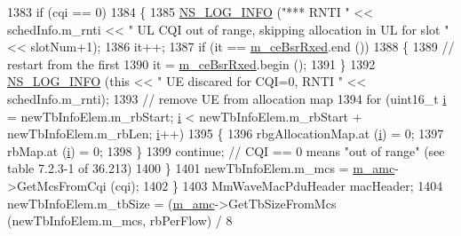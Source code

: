 \begin{DoxyCode}
1383                         \textcolor{keywordflow}{if} (cqi == 0)
1384                         \{
1385                                 \hyperlink{group__logging_gafbd73ee2cf9f26b319f49086d8e860fb}{NS\_LOG\_INFO} (\textcolor{stringliteral}{"*** RNTI "} << schedInfo.m\_rnti << \textcolor{stringliteral}{" UL CQI out of
       range, skipping allocation in UL for slot "} << slotNum+1);
1386                                 it++;
1387                                 \textcolor{keywordflow}{if} (it == \hyperlink{classns3_1_1MmWaveRrMacScheduler_a2ebec374f1ff5014f115ff8b68ff5ebb}{m\_ceBsrRxed}.end ())
1388                                 \{
1389                                         \textcolor{comment}{// restart from the first}
1390                                         it = \hyperlink{classns3_1_1MmWaveRrMacScheduler_a2ebec374f1ff5014f115ff8b68ff5ebb}{m\_ceBsrRxed}.begin ();
1391                                 \}
1392                                 \hyperlink{group__logging_gafbd73ee2cf9f26b319f49086d8e860fb}{NS\_LOG\_INFO} (\textcolor{keyword}{this} << \textcolor{stringliteral}{" UE discared for CQI=0, RNTI "} << 
      schedInfo.m\_rnti);
1393                                 \textcolor{comment}{// remove UE from allocation map}
1394                                 \textcolor{keywordflow}{for} (uint16\_t \hyperlink{bernuolliDistribution_8m_a6f6ccfcf58b31cb6412107d9d5281426}{i} = newTbInfoElem.m\_rbStart; \hyperlink{bernuolliDistribution_8m_a6f6ccfcf58b31cb6412107d9d5281426}{i} < newTbInfoElem.m\_rbStart + 
      newTbInfoElem.m\_rbLen; \hyperlink{bernuolliDistribution_8m_a6f6ccfcf58b31cb6412107d9d5281426}{i}++)
1395                                 \{
1396                                         rbgAllocationMap.at (\hyperlink{bernuolliDistribution_8m_a6f6ccfcf58b31cb6412107d9d5281426}{i}) = 0;
1397                                         rbMap.at (\hyperlink{bernuolliDistribution_8m_a6f6ccfcf58b31cb6412107d9d5281426}{i}) = 0;
1398                                 \}
1399                                 \textcolor{keywordflow}{continue}; \textcolor{comment}{// CQI == 0 means "out of range" (see table 7.2.3-1 of 36.213)}
1400                         \}
1401                         newTbInfoElem.m\_mcs = \hyperlink{classns3_1_1MmWaveRrMacScheduler_abbcdddd7d8733f372963069e1d0395d3}{m\_amc}->GetMcsFromCqi (cqi);
1402                 \}
1403                 MmWaveMacPduHeader macHeader;
1404                 newTbInfoElem.m\_tbSize = (\hyperlink{classns3_1_1MmWaveRrMacScheduler_abbcdddd7d8733f372963069e1d0395d3}{m\_amc}->GetTbSizeFromMcs (newTbInfoElem.m\_mcs, rbPerFlow) / 8

\end{DoxyCode}
